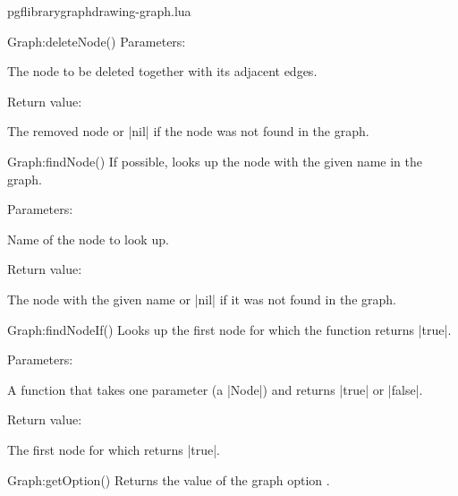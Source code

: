 \begin{filedescription}{pgflibrarygraphdrawing-graph.lua}
\begin{luacommand}{{Graph:deleteNode}()}
Parameters:
\begin{parameterdescription}
	\item[\meta{node}] The node to be deleted together with its adjacent edges. 
\end{parameterdescription}


Return value:
\begin{parameterdescription} 
  \item[] The removed node or |nil| if the node was not found in the graph. 
\end{parameterdescription}


\end{luacommand}
\begin{luacommand}{{Graph:findNode}()}
If possible, looks up the node with the given name in the graph. 

Parameters:
\begin{parameterdescription}
	\item[\meta{name}] Name of the node to look up. 
\end{parameterdescription}


Return value:
\begin{parameterdescription} 
  \item[] The node with the given name or |nil| if it was not found in the graph. 
\end{parameterdescription}


\end{luacommand}
\begin{luacommand}{{Graph:findNodeIf}()}
Looks up the first node for which the function  returns |true|. 

Parameters:
\begin{parameterdescription}
	\item[\meta{test}] A function that takes one parameter (a |Node|) and returns |true| or |false|. 
\end{parameterdescription}


Return value:
\begin{parameterdescription} 
  \item[] The first node for which  returns |true|. 
\end{parameterdescription}


\end{luacommand}
\begin{luacommand}{{Graph:getOption}()}
Returns the value of the graph option . 


\end{luacommand}
\end{filedescription}
